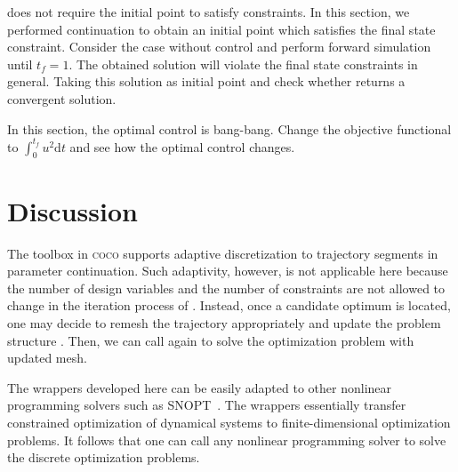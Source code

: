 \begin{exercises}
\item {} does not require the initial point to satisfy constraints. In this section, we performed continuation to obtain an initial point which satisfies the final state constraint. Consider the case without control and perform forward simulation until $t_f=1$. The obtained solution will violate the final state constraints in general. Taking this solution as initial point and check whether  returns a convergent solution.
\item In this section, the optimal control is bang-bang. Change the objective functional to $\int_0^{t_f}u^2\mathrm{d}t$ and see how the optimal control changes.
\end{exercises}



\section{Discussion}
The  toolbox in \textsc{coco} supports adaptive discretization to trajectory segments in parameter continuation. Such adaptivity, however, is not applicable here because the number of design variables and the number of constraints are not allowed to change in the iteration process of . Instead, once a candidate optimum is located, one may decide to remesh the trajectory appropriately and update the problem structure . Then, we can call  again to solve the optimization problem with updated mesh.



The wrappers developed here can be easily adapted to other nonlinear programming solvers such as SNOPT~\cite{gill2005snopt}. The wrappers essentially transfer constrained optimization of dynamical systems to finite-dimensional optimization problems. It follows that one can call any nonlinear programming solver to solve the discrete optimization problems.













